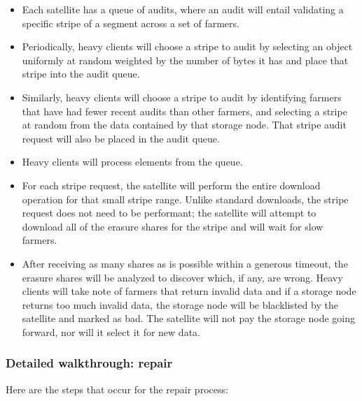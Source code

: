 \documentclass[a4paper,10pt]{article} \usepackage[utf8]{inputenc}
\begin{document}
\begin{itemize}
\item Each satellite has a queue of audits, where an audit will entail
  validating a specific stripe of a segment across a set of farmers.
\item Periodically, heavy clients will choose a stripe to audit by selecting
  an object uniformly at random weighted by the number of bytes it has and place
  that stripe into the audit queue.
\item Similarly, heavy clients will choose a stripe to audit by identifying
  farmers that have had fewer recent audits than other farmers, and selecting
  a stripe at random from the data contained by that storage node. That stripe 
  audit
  request will also be placed in the audit queue.
\item Heavy clients will process elements from the queue.
\item For each stripe request, the satellite will perform the entire download
  operation for that small stripe range. Unlike standard downloads, the stripe
  request does not need to be performant; the satellite will attempt to
  download all of the erasure shares for the stripe and will wait for slow
  farmers.
\item After receiving as many shares as is possible within a generous timeout,
  the erasure shares will be analyzed to discover which, if any, are wrong.
  Heavy clients will take note of farmers that return invalid data and if a
  storage node returns too much invalid data, the storage node will be 
  blacklisted by the
  satellite and marked as bad. The satellite will not pay the storage 
  node going
  forward, nor will it select it for new data.
\end{itemize}

\subsubsection{Detailed walkthrough: repair}

Here are the steps that occur for the repair process: 
\end{document}
